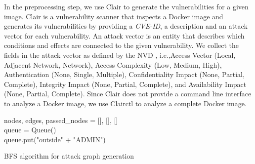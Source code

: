 In the preprocessing step, we use Clair to generate the vulnerabilities for a given image. Clair is a vulnerability scanner that inspects a Docker image and generates its vulnerabilities by providing a \textit{CVE-ID}, a description and an attack vector for each vulnerability. An attack vector is an entity that describes which conditions and effects are connected to the given vulnerability. We collect the fields in the attack vector as defined by the NVD \cite{booth2013national}, i.e.,Access Vector (Local, Adjacent Network, Network), Access Complexity (Low, Medium, High), Authentication (None, Single, Multiple), Confidentiality Impact (None, Partial, Complete), Integrity Impact (None, Partial, Complete), and Availability Impact (None, Partial, Complete). Since Clair does not provide a command line interface to analyze a Docker image, we use Clairctl to analyze a complete Docker image.

\begin{algorithm}
	\SetAlgoLined
	nodes, edges, passed\_nodes = [], [], [] \\ \label{alg:init_1}
	queue = Queue() \\ \label{alg:init_2}
	queue.put("outside" + "ADMIN") \\ \label{alg:attackNodeInit}
	
	
	\caption{BFS algorithm for attack graph generation}
	\label{BFSalgorithm}
\end{algorithm}

